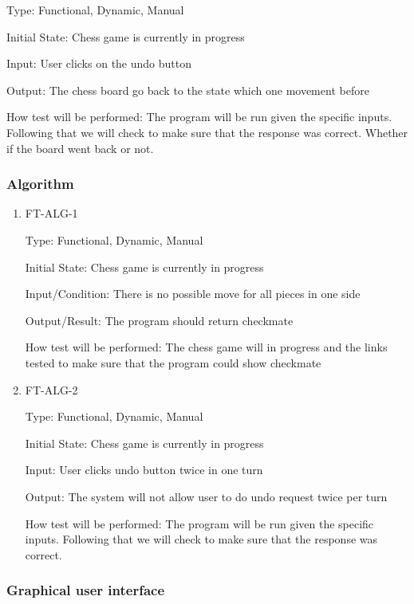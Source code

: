\documentclass[12pt, titlepage]{article}
\begin{document}
\begin{enumerate}
Type: Functional, Dynamic, Manual
					
Initial State: Chess game is currently in progress
					
Input: User clicks on the undo button
					
Output: The chess board go back to the state which one movement before
					
How test will be performed: The program will be run given the specific inputs. Following that we will check to make sure that the response was correct. Whether if the board went back or not.

\end{enumerate}

\subsubsection{Algorithm}

\begin{enumerate}

\item{FT-ALG-1\\}

Type: Functional, Dynamic, Manual
					
Initial State: Chess game is currently in progress
					
Input/Condition: There is no possible move for all pieces in one side
					
Output/Result: The program should return checkmate 
					
How test will be performed: The chess game will in progress and the links tested to make sure that the program could show checkmate 
					
\item{FT-ALG-2\\}

Type: Functional, Dynamic, Manual
					
Initial State: Chess game is currently in progress
					
Input: User clicks undo button twice in one turn
					
Output: The system will not allow user to do undo request twice per turn
					
How test will be performed: The program will be run given the specific inputs. Following that we will check to make sure that the response was correct. 

\end{enumerate}

\subsubsection{Graphical user interface}
\end{document}
